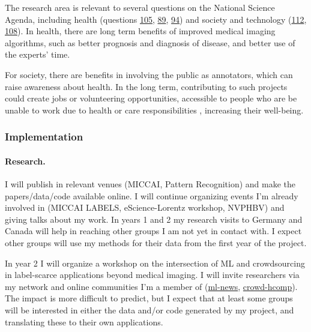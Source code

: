 \documentclass[serif, twocolumn, numeric, rga]{jote-article}
\begin{document}
\noindent The research area is relevant to several questions on the National Science Agenda, including health (questions \href{https://vragen.wetenschapsagenda.nl/cluster/hoe-kunnen-big-data-en-technologische-innovatie-e-health-bijdragen-in-de-zorg}{105}, \href{https://vragen.wetenschapsagenda.nl/cluster/hoe-kunnen-we-longziekten-beter-begrijpen-en-behandelen}{89}, \href{https://vragen.wetenschapsagenda.nl/cluster/hoe-maken-we-de-gezondheidszorg-kwalitatief-zo-goed-mogelijk-en-houden-we-haar-betaalbaar}{94}) and society and technology (\href{https://vragen.wetenschapsagenda.nl/cluster/big-data-kunnen-we-grote-datasets-en-het-verzamelen-daarvan-benutten-voor-het-realiseren-van}{112}, \href{https://vragen.wetenschapsagenda.nl/cluster/welke-sociale-veranderingen-als-gevolg-van-technologische-veranderingen-zijn-aanstaande-en}{108}).
In health, there are long term benefits of improved medical imaging algorithms, such as better prognosis and diagnosis of disease, and better use of the experts' time.

For society, there are benefits in involving the public as annotators, which can raise awareness about health. In the long term, contributing to such projects could create jobs or volunteering opportunities, accessible to people who are be unable to work due to health or care responsibilities \cite{Hara2018}, increasing their well-being.

\subsubsection*{{\large Implementation}}

\paragraph{Research.}

\noindent I will publish in relevant venues (MICCAI, Pattern Recognition) and make the papers/data/code available online. I will continue organizing events I'm already involved in (MICCAI LABELS, eScience-Lorentz workshop, NVPHBV) and giving talks about my work. In years 1 and 2 my research visits to Germany and Canada will help in reaching other groups I am not yet in contact with. I expect other groups will use my methods for their data from the first year of the project.

In year 2 I will organize a workshop on the intersection of ML and crowdsourcing in label-scarce applications beyond medical imaging. I will invite researchers via my network and online communities I'm a member of (\href{https://groups.google.com/forum/\#!forum/ml-news}{ml-news}, \href{https://groups.google.com/forum/\#!forum/crowd-hcomp}{crowd-hcomp}).
The impact is more difficult to predict, but I expect that at least some groups will be interested in either the data and/or code generated by my project, and translating these to their own applications.
\end{document}
